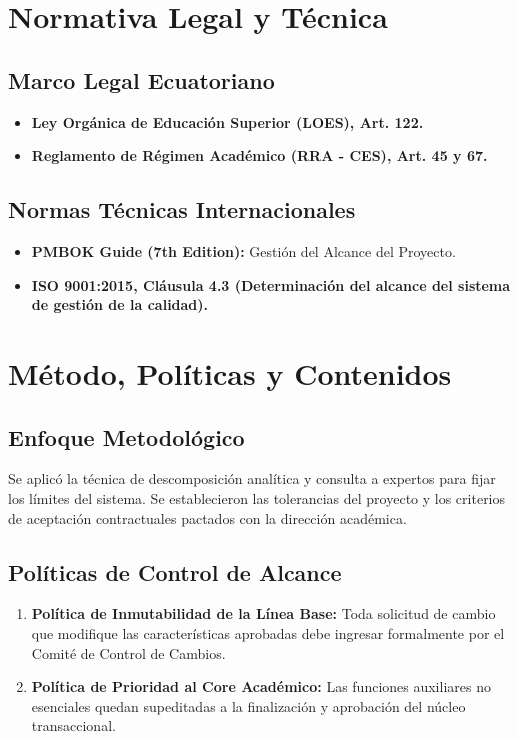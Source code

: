 \documentclass[12pt,a4paper]{article}
\begin{document}
\section{Normativa Legal y Técnica}
\subsection{Marco Legal Ecuatoriano}
\begin{itemize}[leftmargin=1.5em, itemsep=2pt]
    \item \textbf{Ley Orgánica de Educación Superior (LOES), Art. 122.}
    \item \textbf{Reglamento de Régimen Académico (RRA - CES), Art. 45 y 67.}
\end{itemize}
\subsection{Normas Técnicas Internacionales}
\begin{itemize}[leftmargin=1.5em, itemsep=2pt]
    \item \textbf{PMBOK Guide (7th Edition):} Gestión del Alcance del Proyecto.
    \item \textbf{ISO 9001:2015, Cláusula 4.3 (Determinación del alcance del sistema de gestión de la calidad).}
\end{itemize}

\section{Método, Políticas y Contenidos}
\subsection{Enfoque Metodológico}
Se aplicó la técnica de descomposición analítica y consulta a expertos para fijar los límites del sistema. Se establecieron las tolerancias del proyecto y los criterios de aceptación contractuales pactados con la dirección académica.

\subsection{Políticas de Control de Alcance}
\begin{enumerate}[leftmargin=1.5em, itemsep=2pt]
    \item \textbf{Política de Inmutabilidad de la Línea Base:} Toda solicitud de cambio que modifique las características aprobadas debe ingresar formalmente por el Comité de Control de Cambios.
    \item \textbf{Política de Prioridad al Core Académico:} Las funciones auxiliares no esenciales quedan supeditadas a la finalización y aprobación del núcleo transaccional.
\end{enumerate}
\end{document}
